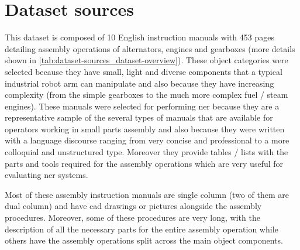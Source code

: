 \section{Dataset sources}\label{sec:dataset-sources}

This dataset is composed of 10 English instruction manuals with 453 pages detailing assembly operations of alternators, engines and gearboxes (more details shown in \cref{tab:dataset-sources_dataset-overview}). These object categories were selected because they have small, light and diverse components that a typical industrial robot arm can manipulate and also because they have increasing complexity (from the simple gearboxes to the much more complex fuel / steam engines). These manuals were selected for performing \gls{ner} because they are a representative sample of the several types of manuals that are available for operators working in small parts assembly and also because they were written with a language discourse ranging from very concise and professional to a more colloquial and unstructured type. Moreover they provide tables / lists with the parts and tools required for the assembly operations which are very useful for evaluating \gls{ner} systems.

Most of these assembly instruction manuals are single column (two of them are dual column) and have \gls{cad} drawings or pictures alongside the assembly procedures. Moreover, some of these procedures are very long, with the description of all the necessary parts for the entire assembly operation while others have the assembly operations split across the main object components.

